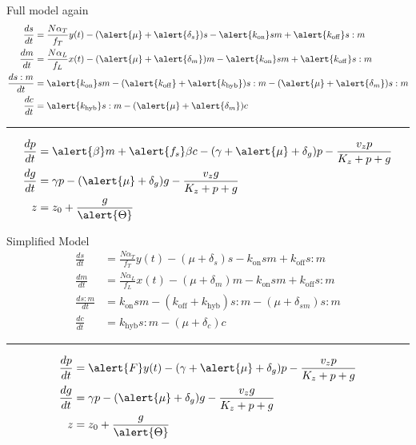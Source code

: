 \documentclass{beamer}
\newenvironment{greyedout}{\color{gray}}{\ignorespacesafterend}
\begin{document}
\small
\begin{frame}{Full model again}
\begin{align*} 
\frac{ds}{dt} &= \frac{N\alpha_{T}}{f_{T}} y(t)-(\alert{\mu} + \alert{\delta_{s}})s -\alert{k_{\mathrm{on}}}sm +\alert{k_{\mathrm{off}}}s:m \\
\frac{dm}{dt} &=  \frac{N\alpha_{L}}{f_{L}}x(t)-(\alert{\mu} + \alert{\delta_{m}})m -\alert{k_{\mathrm{on}}}sm +\alert{k_{\mathrm{off}}}s:m  \\
\frac{ds:m}{dt} & = \alert{k_{\mathrm{on}}}sm  - (\alert{k_{\mathrm{off}}}+ \alert{k_{\mathrm{hyb}}})s:m  -(\alert{\mu} + \alert{\delta_{m}} )s:m \\
\frac{dc}{dt} & = \alert{k_{\mathrm{hyb}}}s:m  -(\alert{\mu} + \alert{\delta_{m}})c  
\end{align*}
\begin{center}
\rule{0.5\textwidth}{.4pt}
\end{center}
\begin{align*} 
\frac{dp}{dt} & = \alert{\beta} m +\alert{f_{s}}\beta c -(\gamma + \alert{\mu} + \delta_{g})p - \frac{v_{z}p}{K_{z}+p+g}   \\
\frac{dg}{dt} & = \gamma p - (\alert{\mu} + \delta_{g})g - \frac{v_{z}g}{K_{z}+p+g} \\
z &= z_{0} +\frac{g}{\alert{\Theta}} 
\end{align*}
\end{frame}
\normalsize

\small
\begin{frame}{Simplified Model}
\begin{greyedout}
\begin{align*} 
\frac{ds}{dt} &= \frac{N\alpha_{T}}{f_{T}} y(t)-(\mu + \delta_{s})s -k_{\mathrm{on}}sm +k_{\mathrm{off}}s:m \\
\frac{dm}{dt} &=  \frac{N\alpha_{L}}{f_{L}}x(t)-(\mu + \delta_{m})m -k_{\mathrm{on}}sm +k_{\mathrm{off}}s:m  \\
\frac{ds:m}{dt} & = k_{\mathrm{on}}sm  - (k_{\mathrm{off}}+ k_{\mathrm{hyb}})s:m  -(\mu + \delta_{sm} )s:m \\
\frac{dc}{dt} & = k_{\mathrm{hyb}}s:m  -(\mu + \delta_{c})c  
\end{align*}
\end{greyedout}
\begin{center}
\rule{0.5\textwidth}{.4pt}
\end{center}
\begin{align*} 
\frac{dp}{dt} & = \alert{F}y(t)-(\gamma + \alert{\mu} + \delta_{g})p - \frac{v_{z}p}{K_{z}+p+g}   \\
\frac{dg}{dt} & = \gamma p - (\alert{\mu} + \delta_{g})g - \frac{v_{z}g}{K_{z}+p+g}  \\
z &= z_{0} +\frac{g}{\alert{\Theta}}  
\end{align*}
\end{frame}
\normalsize
\end{document}
